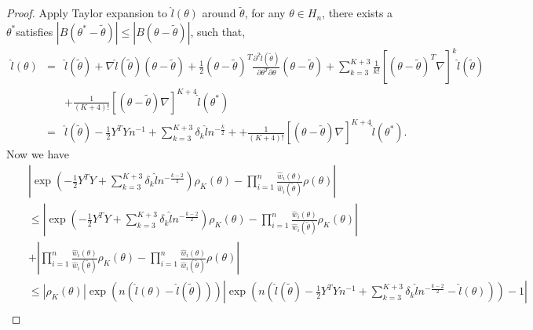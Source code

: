 \begin{proof}
Apply Taylor expansion to $\hat{l}\left(\theta\right)$ around $\tilde{\theta}$,
for any $\theta\in H_{n}$, there exists a $\theta^{*}$satisfies
$\left|B\left(\theta^{*}-\tilde{\theta}\right)\right|\le\left|B\left(\theta-\tilde{\theta}\right)\right|$,
such that, 
\begin{eqnarray*}
\hat{l}\left(\theta\right) & = & \hat{l}\left(\tilde{\theta}\right)+\nabla\hat{l}\left(\tilde{\theta}\right)\left(\theta-\tilde{\theta}\right)+\frac{1}{2}\left(\theta-\tilde{\theta}\right)^{T}\frac{\partial^{2}\hat{l}\left(\tilde{\theta}\right)}{\partial\theta^{T}\partial\theta}\left(\theta-\tilde{\theta}\right)+\sum_{k=3}^{K+3}\frac{1}{k!}\left[\left(\theta-\tilde{\theta}\right)^{T}\nabla\right]^{k}\hat{l}\left(\tilde{\theta}\right)\\
 &  & +\frac{1}{\left(K+4\right)!}\left[\left(\theta-\tilde{\theta}\right)\nabla\right]^{K+4}\hat{l}\left(\theta^{*}\right)\\
 & = & \hat{l}\left(\tilde{\theta}\right)-\frac{1}{2}Y^{T}Yn^{-1}+\sum_{k=3}^{K+3}\delta_{k}\hat{l}n^{-\frac{k}{2}}++\frac{1}{\left(K+4\right)!}\left[\left(\theta-\tilde{\theta}\right)\nabla\right]^{K+4}\hat{l}\left(\theta^{*}\right).
\end{eqnarray*}
Now we have 
\begin{eqnarray*}
 &  & \left|\exp\left(-\frac{1}{2}Y^{T}Y+\sum_{k=3}^{K+3}\delta_{k}\hat{l}n^{-\frac{k-2}{2}}\right)\rho_{K}\left(\theta\right)-\prod_{i=1}^{n}\frac{\hat{w}_{i}\left(\theta\right)}{\hat{w}_{i}\left(\tilde{\theta}\right)}\rho\left(\theta\right)\right|\\
 &  & \le\left|\exp\left(-\frac{1}{2}Y^{T}Y+\sum_{k=3}^{K+3}\delta_{k}\hat{l}n^{-\frac{k-2}{2}}\right)\rho_{K}\left(\theta\right)-\prod_{i=1}^{n}\frac{\hat{w}_{i}\left(\theta\right)}{\hat{w}_{i}\left(\tilde{\theta}\right)}\rho_{K}\left(\theta\right)\right|\\
 &  & +\left|\prod_{i=1}^{n}\frac{\hat{w}_{i}\left(\theta\right)}{\hat{w}_{i}\left(\tilde{\theta}\right)}\rho_{K}\left(\theta\right)-\prod_{i=1}^{n}\frac{\hat{w}_{i}\left(\theta\right)}{\hat{w}_{i}\left(\tilde{\theta}\right)}\rho\left(\theta\right)\right|\\
 &  & \le\left|\rho_{K}\left(\theta\right)\right|\exp\left(n\left(\hat{l}\left(\theta\right)-\hat{l}\left(\tilde{\theta}\right)\right)\right)\left|\exp\left(n\left(\hat{l}\left(\tilde{\theta}\right)-\frac{1}{2}Y^{T}Yn^{-1}+\sum_{k=3}^{K+3}\delta_{k}\hat{l}n^{-\frac{k-2}{2}}-\hat{l}\left(\theta\right)\right)\right)-1\right|\\

\end{eqnarray*}
\end{proof}
